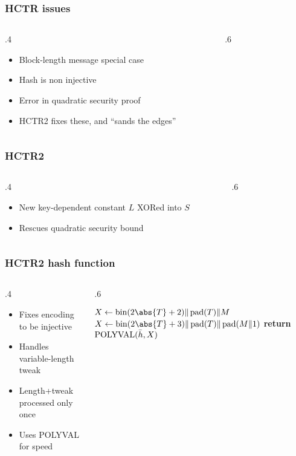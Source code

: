 \documentclass[aspectratio=169]{beamer}
\newenvironment*{figslide}{
    \begin{columns}
        \begin{column}{.4\textwidth}

}{
\end{column}
\begin{column}{.6\textwidth}
    \begin{figure}
        
    \end{figure}
\end{column}
\end{columns}
}
\begin{document}
\begin{frame}

\frametitle{HCTR issues}
\begin{figslide}
        \begin{itemize}
            \item Block-length message special case
            \item Hash is non injective
            \item Error in quadratic security proof
            \item HCTR2 fixes these, and ``sands the edges''
        \end{itemize}
\end{figslide}

\end{frame}

\togglefalse{oldhctr}

\begin{frame}

\frametitle{HCTR2}
\begin{figslide}
    \begin{itemize}
        \item New key-dependent constant \(L\) XORed into \(S\)
        \item Rescues quadratic security bound
    \end{itemize}
\end{figslide}

\end{frame}

\begin{frame}
    \frametitle{HCTR2 hash function}
    \begin{columns}
        \begin{column}{.4\textwidth}
            \begin{itemize}
                \item Fixes encoding to be injective
                \item Handles variable-length tweak
                \item Length+tweak processed only once
                \item Uses POLYVAL for speed
            \end{itemize}
        \end{column}
        \begin{column}{.6\textwidth}
            \begin{algorithmic}
                    \State \(X \gets \fromint(2\abs{T} + 2) \Concat \pad(T) \Concat M\)
                \Else
                    \State \(X \gets \fromint(2\abs{T} + 3) \Concat \pad(T) \Concat \pad(M \Concat 1)\)
                \EndIf
                \State \textbf{return} \(\operatorname{POLYVAL}(\bar{h}, X)\)
                \EndProcedure
            \end{algorithmic}
        \end{column}
    \end{columns}
\end{frame}
\end{document}
